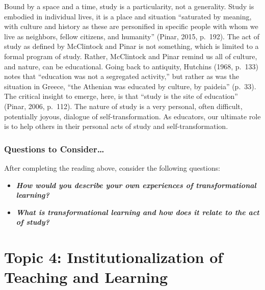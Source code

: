 \documentclass[
]{book}
\providecommand{\tightlist}{%
  \setlength{\itemsep}{0pt}\setlength{\parskip}{0pt}}
\begin{document}
Bound by a space and a time, study is a particularity, not a generality. Study is embodied in individual lives, it is a place and situation ``saturated by meaning, with culture and history as these are personified in specific people with whom we live as neighbors, fellow citizens, and humanity'' (Pinar, 2015, p.~192). The act of study as defined by McClintock and Pinar is not something, which is limited to a formal program of study. Rather, McClintock and Pinar remind us all of culture, and nature, can be educational. Going back to antiquity, Hutchins (1968, p.~133) notes that ``education was not a segregated activity,'' but rather as was the situation in Greece, ``the Athenian was educated by culture, by paideia'' (p.~33). The critical insight to emerge, here, is that ``study is the site of education'' (Pinar, 2006, p.~112). The nature of study is a very personal, often difficult, potentially joyous, dialogue of self-transformation. As educators, our ultimate role is to help others in their personal acts of study and self-transformation.

\begin{reflect}
\hypertarget{questions-to-consider-2}{%
\subsubsection*{Questions to Consider\ldots{}}\label{questions-to-consider-2}}

After completing the reading above, consider the following questions:

\begin{itemize}
\tightlist
\item
  \textbf{\emph{How would you describe your own experiences of transformational learning?}}
\item
  \textbf{\emph{What is transformational learning and how does it relate to the act of study?}}
\end{itemize}
\end{reflect}

\hypertarget{topic-4-institutionalization-of-teaching-and-learning}{%
\section*{Topic 4: Institutionalization of Teaching and Learning}\label{topic-4-institutionalization-of-teaching-and-learning}}
\end{document}
